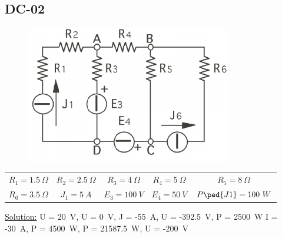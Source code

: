 \subsection{DC-02}
\begin{figure}[h]
\includegraphics[height=6cm]{img/1/02.png}
\centering
\end{figure}
\begin{center}
\begin{tabular}{ c c c c c}
  $R_1 = 1.5 \ \Omega$ & $R_2 = 2.5 \ \Omega$ & $R_3 = 4 \ \Omega$ & $R_4 = 5 \ \Omega$ & $R_5 = 8 \ \Omega$\\
  $R_6 = 3.5\ \Omega$ & $J_1 = 5\ A$ & $E_3 = 100\ V $& $E_4 = 50\ V$ & $P\ped{J1} = 100\ W$ \\
\end{tabular}
\end{center}
\underline{\large{Solution:}}
\newline
U = 20\ V, U = 0\ V, J = -55\ A, U = -392.5\ V, P = 2500\ W
\newline
I = -30\ A, P = 4500\ W, P = 21587.5\ W, U = -200\ V
